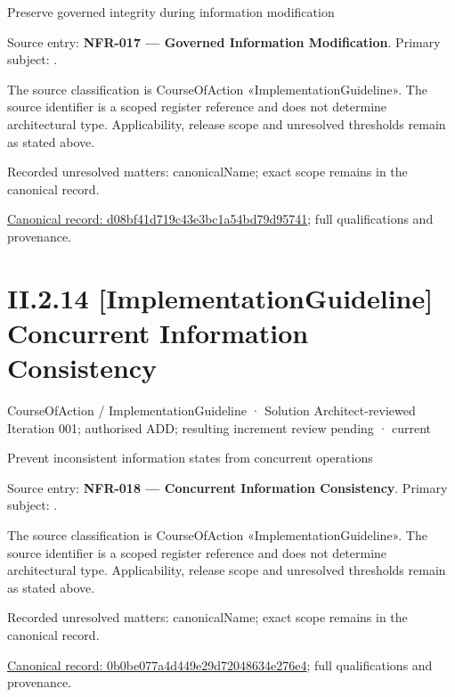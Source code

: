 Preserve governed integrity during information modification



Source entry: \textbf{NFR-017 — Governed Information Modification}. Primary subject: \texttt{}.



The source classification is CourseOfAction «ImplementationGuideline». The source identifier is a scoped register reference and does not determine architectural type. Applicability, release scope and unresolved thresholds remain as stated above.


{\small Recorded unresolved matters: canonicalName; exact scope remains in the canonical record.}\par
{\footnotesize \href{../../../../continuum/strategy/course-of-action/implementation-guideline/d08bf41d719c43e3bc1a54bd79d95741.md}{Canonical record: d08bf41d719c43e3bc1a54bd79d95741}; full qualifications and provenance.}\par
\section*{II.2.14 [ImplementationGuideline] Concurrent Information Consistency}
\label{navigation:II.2.14}

\label{element:0b0be077a4d449e29d72048634e276e4}
{\small CourseOfAction / ImplementationGuideline · Solution Architect-reviewed Iteration 001; authorised ADD; resulting increment review pending · current}\par

Prevent inconsistent information states from concurrent operations



Source entry: \textbf{NFR-018 — Concurrent Information Consistency}. Primary subject: \texttt{}.



The source classification is CourseOfAction «ImplementationGuideline». The source identifier is a scoped register reference and does not determine architectural type. Applicability, release scope and unresolved thresholds remain as stated above.


{\small Recorded unresolved matters: canonicalName; exact scope remains in the canonical record.}\par
{\footnotesize \href{../../../../continuum/strategy/course-of-action/implementation-guideline/0b0be077a4d449e29d72048634e276e4.md}{Canonical record: 0b0be077a4d449e29d72048634e276e4}; full qualifications and provenance.}\par
